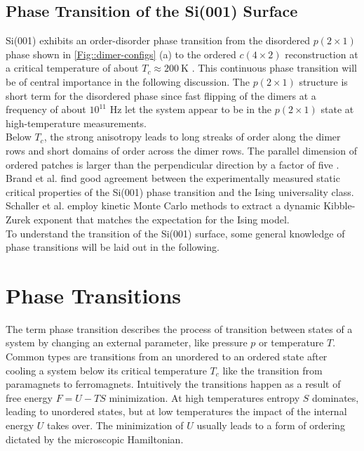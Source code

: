 	\section{Phase Transition of the Si(001) Surface}
	Si(001) exhibits an order-disorder phase transition from the disordered $p(2\times1)$ phase shown in \autoref{Fig::dimer-configs} (a) to the ordered $c(4\times2)$ reconstruction at a critical temperature of about $T_c \approx 200~\text{K}$ \cite{tabata1987order, brand2023dimer}. This continuous phase transition will be of central importance in the following discussion. The $p(2\times1)$ structure is short term for the disordered phase since fast flipping of the dimers at a frequency of about $ 10^{11} \text{ Hz}$ \cite{dabrowski1992self} let the system appear to be in the $p(2\times1)$ state at high-temperature measurements. \\
	
	Below $T_c$, the strong anisotropy leads to long streaks of order along the dimer rows and short domains of order across the dimer rows. The parallel dimension of ordered patches is larger than the perpendicular direction by a factor of five \cite{brand2023dimer}. Brand et al. \cite{brand2023critical, brand2023dimer} find good agreement between the experimentally measured static critical properties of the Si(001) phase transition and the Ising universality class. Schaller et al. \cite{schaller2023sequential} employ kinetic Monte Carlo methods to extract a dynamic Kibble-Zurek exponent that matches the expectation for the Ising model. \\%
	
	To understand the transition of the Si(001) surface, some general knowledge of phase transitions will be laid out in the following.
	\chapter{Phase Transitions} \label{Chapter::Phase-Transitions}
	
	The term phase transition describes the process of transition between states of a system by changing an external parameter, like pressure $p$ or temperature $T$. Common types are transitions from an unordered to an ordered state after cooling a system below its critical temperature $T_c$ like the transition from paramagnets to ferromagnets. Intuitively the transitions happen as a result of free energy $F =	U - TS$ minimization. At high temperatures entropy $S$ dominates, leading to unordered states, but at low temperatures the impact of the internal energy $U$ takes over. The minimization of $U$ usually leads to a form of ordering dictated by the microscopic Hamiltonian. \\
	
